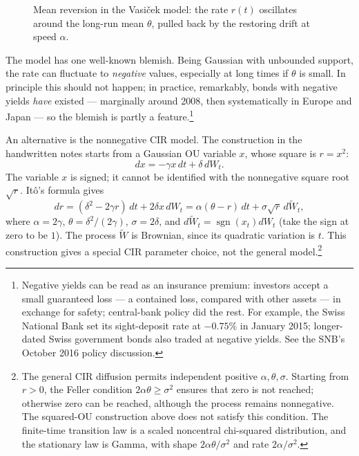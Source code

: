 \begin{figure}[h!]
\centering
{}
\caption{Mean reversion in the Vasi\v{c}ek model: the rate $r(t)$ oscillates around the long-run mean $\theta$, pulled back by the restoring drift at speed $\alpha$.}
\label{fig:mean-reversion}
\end{figure}

The model has one well-known blemish.
Being Gaussian with unbounded support, the rate can fluctuate to \emph{negative} values, especially at long times if $\theta$ is small.
In principle this should not happen; in practice, remarkably, bonds with negative yields \emph{have} existed --- marginally around 2008, then systematically in Europe and Japan --- so the blemish is partly a feature.\footnote{Negative yields can be read as an insurance premium: investors accept a small guaranteed loss --- a contained loss, compared with other assets --- in exchange for safety; central-bank policy did the rest.
For example, the Swiss National Bank set its sight-deposit rate at $-0.75\%$ in January 2015; longer-dated Swiss government bonds also traded at negative yields. See the SNB's October 2016 policy discussion\cite{SNB2016}.}

An alternative is the nonnegative CIR model\cite{CIR1985}.
The construction in the handwritten notes starts from a Gaussian OU variable $x$, whose square is $r=x^2$:
\begin{equation}\label{eq:cir-sde}
 dx=-\gamma x\,dt+\delta\,dW_t.
\end{equation}
The variable $x$ is signed; it cannot be identified with the nonnegative square root $\sqrt r$.
It\^o's formula gives
\[
 dr=(\delta^2-2\gamma r)\,dt+2\delta x\,dW_t
 =\alpha(\theta-r)\,dt+\sigma\sqrt r\,d\widetilde W_t,
\]
where $\alpha=2\gamma$, $\theta=\delta^2/(2\gamma)$, $\sigma=2\delta$, and $d\widetilde W_t=\operatorname{sgn}(x_t)dW_t$ (take the sign at zero to be $1$).
The process $\widetilde W$ is Brownian, since its quadratic variation is $t$.
This construction gives a special CIR parameter choice, not the general model.\footnote{The general CIR diffusion permits independent positive $\alpha,\theta,\sigma$.
Starting from $r>0$, the Feller condition $2\alpha\theta\ge\sigma^2$ ensures that zero is not reached; otherwise zero can be reached, although the process remains nonnegative.
The squared-OU construction above does not satisfy this condition.
The finite-time transition law is a scaled noncentral chi-squared distribution, and the stationary law is Gamma, with shape $2\alpha\theta/\sigma^2$ and rate $2\alpha/\sigma^2$\cite{CIR1985,Bjork2020}.}

